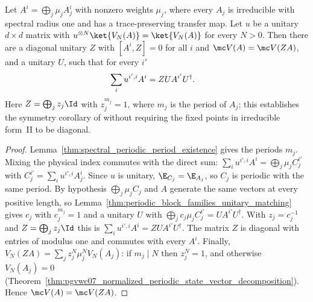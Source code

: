 \begin{theorem}%
    \label{thm:irreducible_form_physical_symmetry}
    \leanok
    Let $A^i=\bigoplus_j\mu_jA_j^i$ with nonzero weights $\mu_j$, where every
    $A_j$ is irreducible with spectral radius one and has a trace-preserving
    transfer map. Let $u$ be a unitary $d\times d$ matrix with
    $u^{\otimes N}\ket{V_N(A)}=\ket{V_N(A)}$ for every $N>0$. Then there are a
    diagonal unitary $Z$ with $[A^i,Z]=0$ for all $i$ and
    $\mc V(A)=\mc V(ZA)$, and a unitary $U$, such that for every $i'$
    \begin{align}
        \sum_iu^{i',i}A^i & =ZUA^{i'}U^\dagger. \notag
    \end{align}
    Here $Z=\bigoplus_jz_j\Id$ with $z_j^{m_j}=1$, where $m_j$ is the
    period of $A_j$; this establishes the symmetry corollary of
    \cite[lines~834--845]{DeLasCuevas2017Irreducible} without requiring the
    fixed points in irreducible form~II to be diagonal.
\end{theorem}

\begin{proof}
    \leanok
    Lemma~\ref{thm:spectral_periodic_period_existence} gives the periods
    $m_j$. Mixing the physical index commutes with the direct sum:
    $\sum_iu^{i',i}A^i=\bigoplus_j\mu_jC_j^{i'}$ with
    $C_j^{i'}=\sum_iu^{i',i}A_j^i$. Since $u$ is unitary, $\E_{C_j}=\E_{A_j}$,
    so $C_j$ is periodic with the same period. By hypothesis
    $\bigoplus_j\mu_jC_j$ and $A$ generate the same vectors at every positive
    length, so Lemma~\ref{thm:periodic_block_families_unitary_matching} gives
    $c_j$ with $c_j^{m_j}=1$ and a unitary $U$ with
    $\bigoplus_jc_j\mu_jC_j^{i'}=UA^{i'}U^\dagger$. With $z_j=c_j^{-1}$ and
    $Z=\bigoplus_jz_j\Id$ this is $\sum_iu^{i',i}A^i=ZUA^{i'}U^\dagger$.
    The matrix $Z$ is diagonal with entries of modulus one and commutes with
    every $A^i$. Finally,
    $V_N(ZA)=\sum_jz_j^N\mu_j^NV_N(A_j)$: if $m_j\mid N$ then $z_j^N=1$, and
    otherwise $V_N(A_j)=0$
    (Theorem~\ref{thm:pgvwc07_normalized_periodic_state_vector_decomposition}).
    Hence $\mc V(A)=\mc V(ZA)$.
\end{proof}

